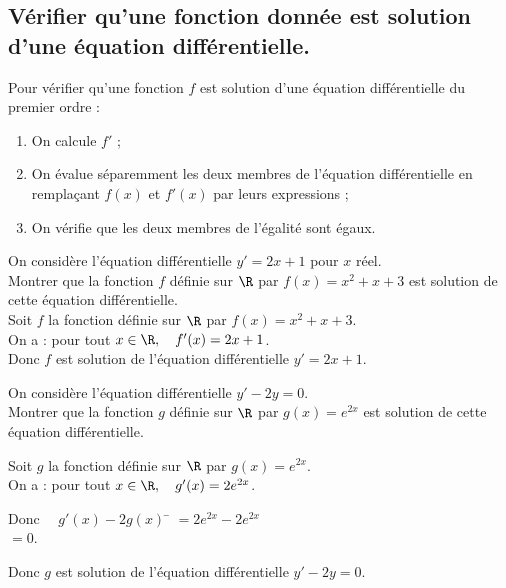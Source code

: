 \documentclass[a4paper,11pt,exos]{nsi} %
\begin{document}
\maketitle

\subsection*{Vérifier qu’une fonction donnée est solution d’une équation différentielle.}

\begin{methode}
Pour vérifier qu'une fonction $f$ est solution d'une équation différentielle du premier ordre :
\begin{enumerate}[label=\bullet]
    \item On calcule $f'$ ;
    \item On évalue séparemment les deux membres de l'équation différentielle en remplaçant $f(x)$ et $f'(x)$ par leurs expressions ;
    \item On vérifie que les deux membres de l'égalité sont égaux.
\end{enumerate}
\end{methode}
\exo{}
On considère l'équation différentielle $y' = 2x+1$ pour $x$ réel.\\
Montrer que la fonction $f$ définie sur $\R$ par $f(x)=x^2+x+3$ est solution de cette équation différentielle.\\

\textcolor{UGLiBlue}{
    Soit $f$ la fonction définie sur $\R$ par $f(x)=x^2+x+3$.\\
    On a : pour tout $x\in\R, \quad f'(x)=2x+1$.\\
    Donc $f$ est solution de l'équation différentielle $y'=2x+1$.
}

\exo{}
On considère l'équation différentielle $y'-2y = 0$.\\
Montrer que la fonction $g$ définie sur $\R$ par $g(x)=e^{2x}$ est solution de cette équation différentielle.\\

\textcolor{UGLiBlue}{
    Soit $g$ la fonction définie sur $\R$ par $g(x)=e^{2x}$.\\
    On a : pour tout $x\in\R, \quad g'(x)=2e^{2x}$.
    \begin{tabbing}
       Donc $\quad g'(x)-2g(x)$ \= $= 2e^{2x}-2e^{2x}$\\
        \>  $=0$.
    \end{tabbing}
    Donc $g$ est solution de l'équation différentielle $y'-2y=0$.
}
\end{document}
